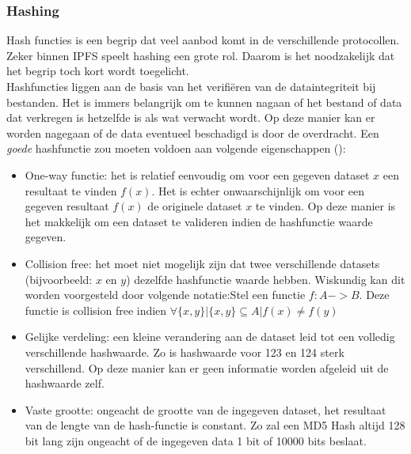 \subsubsection{Hashing}
Hash functies is een begrip dat veel aanbod komt in de verschillende protocollen.  Zeker binnen IPFS speelt hashing een grote rol. Daarom is het noodzakelijk dat het begrip toch kort wordt toegelicht.\\

Hashfuncties liggen aan de basis van het verifiëren van de dataintegriteit bij bestanden. Het is immers belangrijk om te kunnen nagaan of het bestand of data dat verkregen is hetzelfde is als wat verwacht wordt. Op deze manier kan er worden nagegaan of de data eventueel beschadigd is door de overdracht. Een \textit{goede} hashfunctie zou moeten voldoen aan volgende eigenschappen (\autocite{Anderson93}):

\begin{itemize}
\item One-way functie: het is relatief eenvoudig om voor een gegeven dataset $x$ een resultaat te vinden $f(x)$. Het is echter onwaarschijnlijk om voor een gegeven resultaat $f(x)$ de originele dataset $x$ te vinden. Op deze manier is het makkelijk om een dataset te valideren indien de hashfunctie waarde gegeven.\\
\item Collision free: het moet niet mogelijk zijn dat twee verschillende datasets (bijvoorbeeld: $x$ en $y$) dezelfde hashfunctie waarde hebben. Wiskundig kan dit worden voorgesteld door volgende notatie:Stel een functie $f:A->B$. Deze functie is collision free indien $\forall \{x,y\}|\{x,y\} \subseteq A | f(x) \neq f(y)$\\
\item Gelijke verdeling: een kleine verandering aan de dataset leid tot een volledig verschillende hashwaarde. Zo is hashwaarde voor 123 en 124 sterk verschillend. Op deze manier kan er geen informatie worden afgeleid uit de hashwaarde zelf.\\
\item Vaste grootte: ongeacht de grootte van de ingegeven dataset, het resultaat van de lengte van de hash-functie is constant. Zo zal een MD5 Hash altijd 128 bit lang zijn ongeacht of de ingegeven data 1 bit of 10000 bits beslaat.
\end{itemize}


